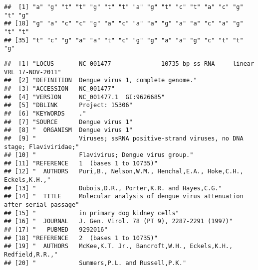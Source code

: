 \documentclass[]{article}
\newenvironment{Shaded}{\begin{snugshade}}{\end{snugshade}}
\newcommand{\KeywordTok}[1]{\textcolor[rgb]{0.13,0.29,0.53}{\textbf{#1}}}
\newcommand{\DecValTok}[1]{\textcolor[rgb]{0.00,0.00,0.81}{#1}}
\newcommand{\StringTok}[1]{\textcolor[rgb]{0.31,0.60,0.02}{#1}}
\newcommand{\CommentTok}[1]{\textcolor[rgb]{0.56,0.35,0.01}{\textit{#1}}}
\newcommand{\OperatorTok}[1]{\textcolor[rgb]{0.81,0.36,0.00}{\textbf{#1}}}
\newcommand{\NormalTok}[1]{#1}
\begin{document}
\begin{verbatim}
##  [1] "a" "g" "t" "t" "g" "t" "t" "a" "g" "t" "c" "t" "a" "c" "g" "t" "g"
## [18] "g" "a" "c" "c" "g" "a" "c" "a" "a" "g" "a" "a" "c" "a" "g" "t" "t"
## [35] "t" "c" "g" "a" "a" "t" "c" "g" "g" "a" "a" "g" "c" "t" "t" "g"
\end{verbatim}

\begin{Shaded}
\end{Shaded}

\begin{verbatim}
##  [1] "LOCUS       NC_001477              10735 bp ss-RNA     linear   VRL 17-NOV-2011"
##  [2] "DEFINITION  Dengue virus 1, complete genome."                                   
##  [3] "ACCESSION   NC_001477"                                                          
##  [4] "VERSION     NC_001477.1  GI:9626685"                                            
##  [5] "DBLINK      Project: 15306"                                                     
##  [6] "KEYWORDS    ."                                                                  
##  [7] "SOURCE      Dengue virus 1"                                                     
##  [8] "  ORGANISM  Dengue virus 1"                                                     
##  [9] "            Viruses; ssRNA positive-strand viruses, no DNA stage; Flaviviridae;"
## [10] "            Flavivirus; Dengue virus group."                                    
## [11] "REFERENCE   1  (bases 1 to 10735)"                                              
## [12] "  AUTHORS   Puri,B., Nelson,W.M., Henchal,E.A., Hoke,C.H., Eckels,K.H.,"        
## [13] "            Dubois,D.R., Porter,K.R. and Hayes,C.G."                            
## [14] "  TITLE     Molecular analysis of dengue virus attenuation after serial passage"
## [15] "            in primary dog kidney cells"                                        
## [16] "  JOURNAL   J. Gen. Virol. 78 (PT 9), 2287-2291 (1997)"                         
## [17] "   PUBMED   9292016"                                                            
## [18] "REFERENCE   2  (bases 1 to 10735)"                                              
## [19] "  AUTHORS   McKee,K.T. Jr., Bancroft,W.H., Eckels,K.H., Redfield,R.R.,"         
## [20] "            Summers,P.L. and Russell,P.K."
\end{verbatim}
\end{document}
